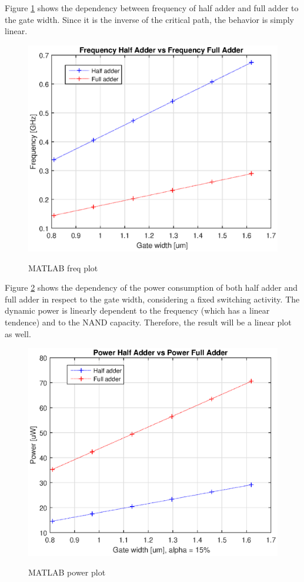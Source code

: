 \newpage
Figure \ref{freq_rep} shows the dependency between frequency of half adder and full adder to the gate width. Since it is the inverse of the critical path, the behavior is simply linear.
\begin{figure}[h]
	\caption{MATLAB freq plot}
	\includegraphics{img/freq_rep}
	\centering
	\label{freq_rep}
\end{figure}

\newpage
Figure \ref{power_rep} shows the dependency of the power consumption of both half adder and full adder in respect to the gate width, considering a fixed switching activity. The dynamic power is linearly dependent to the frequency (which has a linear tendence) and to the NAND capacity. Therefore, the result will be a linear plot as well.
\begin{figure}[h]
	\caption{MATLAB power plot}
	\includegraphics{img/power_rep}
	\centering
	\label{power_rep}
\end{figure}

